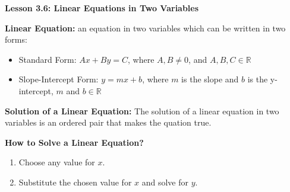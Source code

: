   \begin{center}
\textbf{Lesson 3.6: Linear Equations in Two Variables}
\end{center}

\vspace*{-1ex}

\textbf{Linear Equation:} an equation in two variables which can be written in two forms: 
\begin{itemize} 
\item Standard Form: $ Ax+By=C $, where $ A, B \neq 0$, and $ A, B, C \in \mathbb{R} $
\item Slope-Intercept Form: $ y=mx+b $, where $ m $ is the slope and $ b $ is the y-intercept, $ m $ and $ b \in\mathbb{R} $ 
\end{itemize} 

\textbf{Solution of a Linear Equation:} The solution of a linear equation in two variables is an ordered pair that makes the quation true.

\textbf{How to Solve a Linear Equation?}
	\begin{enumerate}
		\item Choose any value for $ x $.
		\item Substitute the chosen value for $ x $ and solve for $ y $.
	\end{enumerate}
